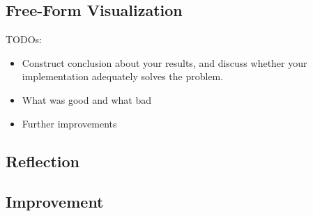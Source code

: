 \documentclass{article}
\begin{document}
\subsection{Free-Form Visualization}
\color{red}
TODOs:
\begin{itemize}
    \item Construct conclusion about your results, and discuss whether your implementation adequately solves the problem.
    \item What was good and what bad
    \item Further improvements
\end{itemize}
\color{black}

\subsection{Reflection}

\subsection{Improvement}



\end{document}
